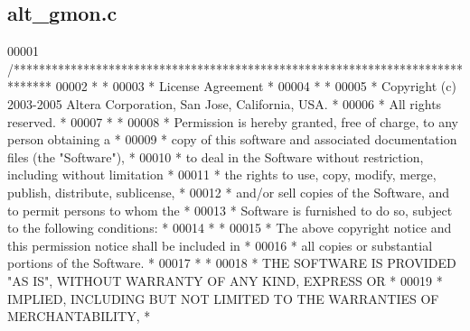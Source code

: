 \subsection{alt\+\_\+gmon.\+c}
\label{alt__gmon_8c_source}

\begin{DoxyCode}
00001 \textcolor{comment}{/******************************************************************************}
00002 \textcolor{comment}{*                                                                             *}
00003 \textcolor{comment}{* License Agreement                                                           *}
00004 \textcolor{comment}{*                                                                             *}
00005 \textcolor{comment}{* Copyright (c) 2003-2005 Altera Corporation, San Jose, California, USA.      *}
00006 \textcolor{comment}{* All rights reserved.                                                        *}
00007 \textcolor{comment}{*                                                                             *}
00008 \textcolor{comment}{* Permission is hereby granted, free of charge, to any person obtaining a     *}
00009 \textcolor{comment}{* copy of this software and associated documentation files (the "Software"),  *}
00010 \textcolor{comment}{* to deal in the Software without restriction, including without limitation   *}
00011 \textcolor{comment}{* the rights to use, copy, modify, merge, publish, distribute, sublicense,    *}
00012 \textcolor{comment}{* and/or sell copies of the Software, and to permit persons to whom the       *}
00013 \textcolor{comment}{* Software is furnished to do so, subject to the following conditions:        *}
00014 \textcolor{comment}{*                                                                             *}
00015 \textcolor{comment}{* The above copyright notice and this permission notice shall be included in  *}
00016 \textcolor{comment}{* all copies or substantial portions of the Software.                         *}
00017 \textcolor{comment}{*                                                                             *}
00018 \textcolor{comment}{* THE SOFTWARE IS PROVIDED "AS IS", WITHOUT WARRANTY OF ANY KIND, EXPRESS OR  *}
00019 \textcolor{comment}{* IMPLIED, INCLUDING BUT NOT LIMITED TO THE WARRANTIES OF MERCHANTABILITY,    *}

\end{DoxyCode}
